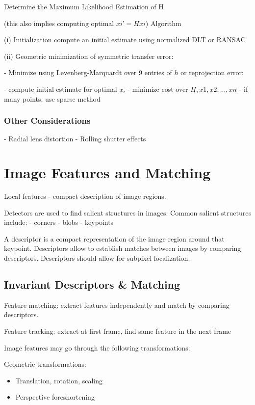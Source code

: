 Determine the Maximum Likelihood Estimation of H

(this also implies computing optimal $xi’=Hxi$) Algorithm

(i) Initialization compute an initial estimate using normalized DLT or RANSAC

(ii) Geometric minimization of symmetric transfer error: 

- Minimize using Levenberg-Marquardt over 9 entries of $h$ or reprojection error:

- compute initial estimate for optimal $x_i$
- minimize cost over ${H,x1,x2,...,xn}$
- if many points, use sparse method

\subsubsection{Other Considerations}

- Radial lens distortion
- Rolling shutter effects

\section{Image Features and Matching}

Local features - compact description of image regions.

Detectors are used to find salient structures in images. Common salient structures include:
- corners
- blobs
- keypoints

A descriptor is a compact representation of the image region around that keypoint.
Descriptors allow to establish matches between images by comparing descriptors.
Descriptors should allow for subpixel localization.

\subsection{ Invariant Descriptors \& Matching}

Feature matching: extract features independently and match by comparing descriptors.

Feature tracking: extract at first frame, find same feature in the next frame

Image features may go through the following transformations:

Geometric transformations:
\begin{itemize}
\item Translation, rotation, scaling
\item Perspective foreshortening 
\end{itemize}

